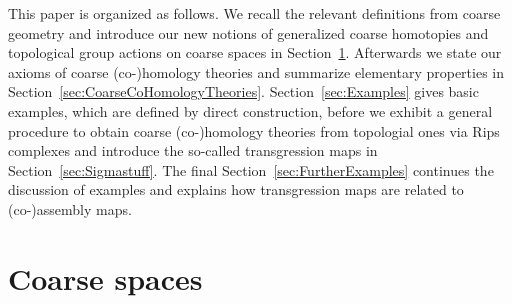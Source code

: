 \documentclass[pdftex]{sigma}
\numberwithin{equation}{section}
\theoremstyle{definition}
\begin{document}
This paper is organized as follows. We recall the relevant definitions from coarse geometry and introduce our new notions of generalized coarse homotopies and topological group actions on coarse spaces in Section~\ref{sec:CoarseGeometry}. Afterwards we state our axioms of coarse \mbox{(co-)}homology theories and summarize elementary properties in Section~\ref{sec:CoarseCoHomologyTheories}. Section~\ref{sec:Examples} gives basic examples, which are defined by direct construction, before we exhibit a general procedure to obtain coarse \mbox{(co-)}homology theories from topologial ones via Rips complexes and introduce the so-called transgression maps in Section~\ref{sec:Sigmastuff}. The final Section~\ref{sec:FurtherExamples} continues the discussion of examples and explains how transgression maps are related to \mbox{(co-)}assembly maps.

\section{Coarse spaces}
\label{sec:CoarseGeometry}
\end{document}
